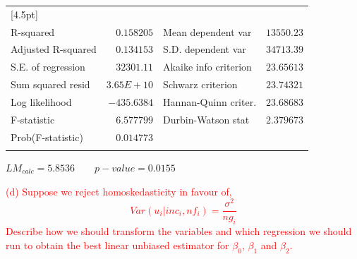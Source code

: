 \documentclass[12pt]{report}
\begin{document}
\begin{table}[H]
\begin{tabular}{lrrrr}
		[4.5pt] \hline \\ [-4.5pt]
		\multicolumn{1}{l}{R-squared}&\multicolumn{1}{r}{$0.158205$}&\multicolumn{2}{l}{Mean dependent var}&\multicolumn{1}{r}{$13550.23$}\\
		\multicolumn{1}{l}{Adjusted R-squared}&\multicolumn{1}{r}{$0.134153$}&\multicolumn{2}{l}{S.D. dependent var}&\multicolumn{1}{r}{$34713.39$}\\
		\multicolumn{1}{l}{S.E. of regression}&\multicolumn{1}{r}{$32301.11$}&\multicolumn{2}{l}{Akaike info criterion}&\multicolumn{1}{r}{$23.65613$}\\
		\multicolumn{1}{l}{Sum squared resid}&\multicolumn{1}{r}{$3.65E+10$}&\multicolumn{2}{l}{Schwarz criterion}&\multicolumn{1}{r}{$23.74321$}\\
		\multicolumn{1}{l}{Log likelihood}&\multicolumn{1}{r}{$-435.6384$}&\multicolumn{2}{l}{Hannan-Quinn criter.}&\multicolumn{1}{r}{$23.68683$}\\
		\multicolumn{1}{l}{F-statistic}&\multicolumn{1}{r}{$6.577799$}&\multicolumn{2}{l}{Durbin-Watson stat}&\multicolumn{1}{r}{$2.379673$}\\
		\multicolumn{1}{l}{Prob(F-statistic)}&\multicolumn{1}{r}{$0.014773$}&\multicolumn{1}{c}{}&\multicolumn{1}{c}{}&\multicolumn{1}{c}{}\\
		[4.5pt] \hline \\ [-4.5pt]
	\end{tabular}
\end{table} \centering
$LM_{calc} = 5.8536 \qquad p-value=0.0155$


\newpage
\justify
\noindent \textcolor{red}
{
	(d) Suppose we reject homoskedasticity in favour of,
	$$Var(u_i|inc_i,nf_i)=\dfrac{\sigma^2}{ng_i}$$
	Describe how we should transform the variables and which regression we should run to obtain the best linear unbiased estimator for $\beta_0$, $\beta_1$ and $\beta_2$.
}
\end{document}

